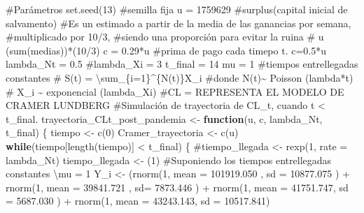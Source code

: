 \documentclass[
  us-letterpaper,
]{scrreprt}
\newenvironment{Shaded}{\begin{snugshade}}{\end{snugshade}}
\newcommand{\AttributeTok}[1]{\textcolor[rgb]{0.40,0.45,0.13}{#1}}
\newcommand{\CommentTok}[1]{\textcolor[rgb]{0.37,0.37,0.37}{#1}}
\newcommand{\ControlFlowTok}[1]{\textcolor[rgb]{0.00,0.23,0.31}{\textbf{#1}}}
\newcommand{\DecValTok}[1]{\textcolor[rgb]{0.68,0.00,0.00}{#1}}
\newcommand{\FloatTok}[1]{\textcolor[rgb]{0.68,0.00,0.00}{#1}}
\newcommand{\FunctionTok}[1]{\textcolor[rgb]{0.28,0.35,0.67}{#1}}
\newcommand{\NormalTok}[1]{\textcolor[rgb]{0.00,0.23,0.31}{#1}}
\newcommand{\OtherTok}[1]{\textcolor[rgb]{0.00,0.23,0.31}{#1}}
\newcommand{\SpecialCharTok}[1]{\textcolor[rgb]{0.37,0.37,0.37}{#1}}
\theoremstyle{plain}
\theoremstyle{plain}
\theoremstyle{definition}
\theoremstyle{remark}
\begin{document}
\begin{Shaded}
\begin{Highlighting}[]
\CommentTok{\#Parámetros}
\FunctionTok{set.seed}\NormalTok{(}\DecValTok{13}\NormalTok{) }\CommentTok{\#semilla fija}
\NormalTok{u }\OtherTok{=} \DecValTok{1759629} \CommentTok{\#surplus(capital inicial de salvamento)}
\CommentTok{\#Es un estimado a partir de la media de las ganancias por semana, }
\CommentTok{\#multiplicado por 10/3, }
\CommentTok{\#siendo una proporción para evitar la ruina}
\CommentTok{\# u (sum(medias))*(10/3)}
\NormalTok{c }\OtherTok{=} \FloatTok{0.29}\SpecialCharTok{*}\NormalTok{u }\CommentTok{\#prima de pago cada timepo t. c=0.5*u}
\NormalTok{lambda\_Nt }\OtherTok{=} \FloatTok{0.5}
\CommentTok{\#lambda\_Xi = 3}
\NormalTok{t\_final }\OtherTok{=} \DecValTok{14}
\NormalTok{mu }\OtherTok{=} \DecValTok{1} \CommentTok{\#tiempos entrellegadas constantes}
\CommentTok{\# S(t) = \textbackslash{}sum\_\{i=1\}\^{}\{N(t)\}X\_i}
\CommentTok{\#donde N(t)\textasciitilde{} Poisson (lambda*t)}
\CommentTok{\# X\_i \textasciitilde{} exponencial (lambda\_Xi)}
\CommentTok{\#CL = REPRESENTA EL MODELO DE CRAMER LUNDBERG}
\CommentTok{\#Simulación de trayectoria de CL\_t, cuando t \textless{} t\_final.}
\NormalTok{trayectoria\_CLt\_post\_pandemia }\OtherTok{\textless{}{-}} \ControlFlowTok{function}\NormalTok{(u, c, lambda\_Nt, t\_final)}
\NormalTok{\{}
\NormalTok{  tiempo }\OtherTok{\textless{}{-}} \FunctionTok{c}\NormalTok{(}\DecValTok{0}\NormalTok{)}
\NormalTok{  Cramer\_trayectoria }\OtherTok{\textless{}{-}} \FunctionTok{c}\NormalTok{(u)}
  \ControlFlowTok{while}\NormalTok{(tiempo[}\FunctionTok{length}\NormalTok{(tiempo)] }\SpecialCharTok{\textless{}}\NormalTok{ t\_final)}
\NormalTok{  \{}
    \CommentTok{\#tiempo\_llegada \textless{}{-} rexp(1, rate = lambda\_Nt)}
\NormalTok{    tiempo\_llegada }\OtherTok{\textless{}{-}}\NormalTok{ (}\DecValTok{1}\NormalTok{) }
\CommentTok{\#Suponiendo los tiempos entrellegadas constantes \textbackslash{}mu = 1}
\NormalTok{    Y\_i }\OtherTok{\textless{}{-}}\NormalTok{  (}\FunctionTok{rnorm}\NormalTok{(}\DecValTok{1}\NormalTok{, }\AttributeTok{mean =} \FloatTok{101919.050}\NormalTok{ , }\AttributeTok{sd =} \FloatTok{10877.075}\NormalTok{   ) }
              \SpecialCharTok{+} \FunctionTok{rnorm}\NormalTok{(}\DecValTok{1}\NormalTok{, }\AttributeTok{mean =}  \FloatTok{39841.721}\NormalTok{ , }\AttributeTok{sd=} \FloatTok{7873.446}\NormalTok{  ) }
              \SpecialCharTok{+} \FunctionTok{rnorm}\NormalTok{(}\DecValTok{1}\NormalTok{, }\AttributeTok{mean =}   \FloatTok{41751.747}\NormalTok{, }\AttributeTok{sd =} \FloatTok{5687.030}\NormalTok{ ) }
              \SpecialCharTok{+} \FunctionTok{rnorm}\NormalTok{(}\DecValTok{1}\NormalTok{, }\AttributeTok{mean =}   \FloatTok{43243.143}\NormalTok{, }\AttributeTok{sd =} \FloatTok{10517.841}\NormalTok{) }

\end{Highlighting}
\end{Shaded}
\end{document}
